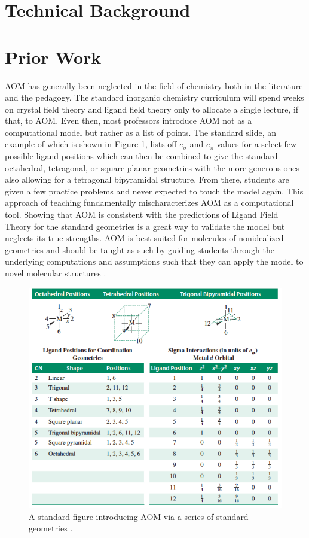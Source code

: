 \documentclass[10pt,twocolumn]{article}
\begin{document}
\section{Technical Background}

\section{Prior Work}
AOM has generally been neglected in the field of chemistry both in the literature and the pedagogy. The standard inorganic chemistry curriculum will spend weeks on crystal field theory and ligand field theory only to allocate a single lecture, if that, to AOM. Even then, most professors introduce AOM not as a computational model but rather as a list of points. The standard slide, an example of which is shown in Figure \ref{fig:aomslide}, lists off $e_\sigma$ and $e_\pi$ values for a select few possible ligand positions which can then be combined to give the standard octahedral, tetragonal, or square planar geometries with the more generous ones also allowing for a tetragonal bipyramidal structure. From there, students are given a few practice problems and never expected to touch the model again. This approach of teaching fundamentally mischaracterizes AOM as a computational tool. Showing that AOM is consistent with the predictions of Ligand Field Theory for the standard geometries is a great way to validate the model but neglects its true strengths. AOM is best suited for molecules of nonidealized geometries and should be taught as such by guiding students through the underlying computations and assumptions such that they can apply the model to novel molecular structures \cite{larsen1974}.

\begin{figure}
	\centering
	\includegraphics[width=.95\linewidth]{aomslide.png}
	\caption{
		A standard figure introducing AOM via a series of standard geometries \cite{miessler_inorganic_2014}.
	}
	\label{fig:aomslide}
\end{figure}
\end{document}
